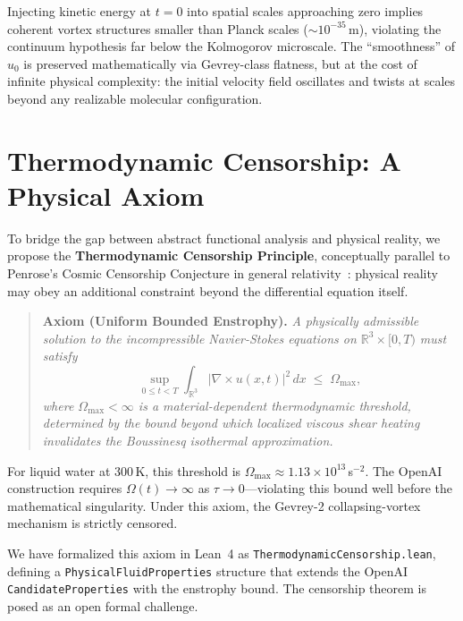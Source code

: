 \documentclass[11pt,a4paper]{article}
\begin{document}
Injecting kinetic energy at $t = 0$ into spatial scales approaching zero implies coherent vortex
structures smaller than Planck scales ($\sim 10^{-35}$\,m), violating the continuum hypothesis
far below the Kolmogorov microscale. The ``smoothness'' of $u_0$ is preserved mathematically via
Gevrey-class flatness, but at the cost of infinite physical complexity: the initial velocity field
oscillates and twists at scales beyond any realizable molecular configuration.

\section{Thermodynamic Censorship: A Physical Axiom}

To bridge the gap between abstract functional analysis and physical reality, we propose the
\textbf{Thermodynamic Censorship Principle}, conceptually parallel to Penrose's Cosmic Censorship
Conjecture in general relativity~\cite{Penrose1969}: physical reality may obey an additional
constraint beyond the differential equation itself.

\begin{quote}
  \textbf{Axiom (Uniform Bounded Enstrophy).} \textit{A physically admissible solution to the
  incompressible Navier-Stokes equations on $\mathbb{R}^3 \times [0, T)$ must satisfy}
  \begin{equation}
    \sup_{0 \le t < T} \int_{\mathbb{R}^3} |\nabla \times u(x,t)|^2\,dx \;\le\; \Omega_{\max},
  \end{equation}
  \textit{where $\Omega_{\max} < \infty$ is a material-dependent thermodynamic threshold,
  determined by the bound beyond which localized viscous shear heating invalidates the Boussinesq
  isothermal approximation.}
\end{quote}

For liquid water at 300\,K, this threshold is $\Omega_{\max} \approx 1.13 \times 10^{13}$\,s$^{-2}$.
The OpenAI construction requires $\Omega(t) \to \infty$ as $\tau \to 0$---violating this bound
well before the mathematical singularity. Under this axiom, the Gevrey-2 collapsing-vortex
mechanism is strictly censored.

We have formalized this axiom in Lean~4 as \texttt{ThermodynamicCensorship.lean}, defining a
\texttt{PhysicalFluidProperties} structure that extends the OpenAI \texttt{CandidateProperties}
with the enstrophy bound. The censorship theorem is posed as an open formal challenge.
\end{document}

